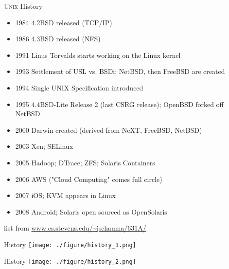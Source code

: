 \documentclass[newPxFont,sthlmFooter,nooffset]{beamer}
\begin{document}
\begin{frame}[t]{\textsc{Unix} History}
\begin{itemize}\small
	\item 1984 4.2BSD released (TCP/IP)
	\item 1986 4.3BSD released (NFS)
	\item 1991 Linus Torvalds starts working on the Linux kernel
	\item 1993 Settlement of USL vs. BSDi; NetBSD, then FreeBSD are created
	\item 1994 Single UNIX Specification introduced
	\item 1995 4.4BSD-Lite Release 2 (last CSRG release); OpenBSD
		forked off NetBSD
	\item 2000 Darwin created (derived from NeXT, FreeBSD, NetBSD)
	\item 2003 Xen; SELinux
	\item 2005 Hadoop; DTrace; ZFS; Solaris Containers
	\item 2006 AWS ("Cloud Computing" comes full circle)
	\item 2007 iOS; KVM appears in Linux
	\item 2008 Android; Solaris open sourced as OpenSolaris
\end{itemize}

list from \url{www.cs.stevens.edu/~jschauma/631A/}

\end{frame}



\begin{frame}[c]{History}
\centering
\texttt{[image: ./figure/history\_1.png]}
\end{frame}


\begin{frame}[c]{History}
\centering
\texttt{[image: ./figure/history\_2.png]}
\end{frame}
\end{document}
